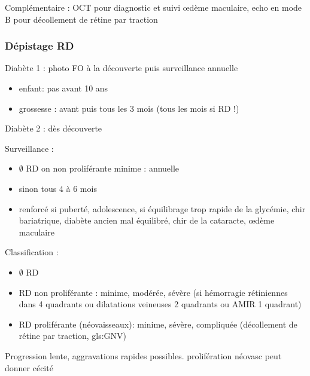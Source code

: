 \documentclass[11pt]{article}
\begin{document}
Complémentaire : OCT pour diagnostic et suivi \oe{}dème maculaire, echo en mode B
pour décollement de rétine par traction

\subsubsection{Dépistage RD}
\label{sec:org39b4ca6}
Diabète 1 : photo FO à la découverte puis surveillance annuelle
\begin{itemize}
\item enfant: pas avant 10 ans
\item grossesse : avant puis tous les 3 mois (tous les mois si RD !)
\end{itemize}
Diabète 2 : dès découverte

Surveillance :
\begin{itemize}
\item \(\emptyset\) RD on non proliférante minime : annuelle
\item sinon tous 4 à 6 mois
\item renforcé si puberté, adolescence, si équilibrage trop rapide de la glycémie,
chir bariatrique, diabète ancien mal équilibré, chir de la cataracte,
\oe{}dème maculaire
\end{itemize}

Classification :
\begin{itemize}
\item \(\emptyset\) RD
\item RD non proliférante : minime, modérée, sévère (si hémorragie rétiniennes dans 4
quadrants ou dilatations veineuses 2 quadrants ou AMIR 1 quadrant)
\item RD proliférante (néovaisseaux): minime, sévère, compliquée (décollement de
rétine par traction, gls:GNV)
\end{itemize}

Progression lente, aggravations rapides possibles. \danger prolifération néovasc
peut donner cécité 
\end{document}
